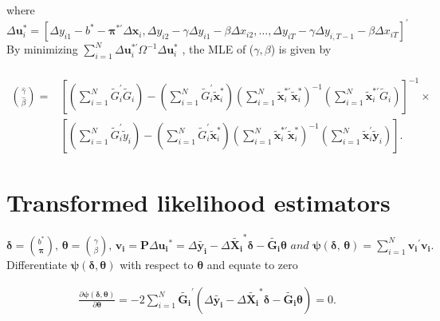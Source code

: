 \documentclass[12pt,a4paper,hyperref]{article}
\begin{document}
where
\begin{equation}
\Delta \boldsymbol{u}_{i}^{\ast}=[\Delta y_{i1}-b^{\ast}-\boldsymbol{\pi}^{\ast '} \Delta \boldsymbol{x}_{i}, \Delta y_{i2}-\gamma \Delta y_{i1}- \beta \Delta x_{i2},\ldots, \Delta y_{iT}-\gamma \Delta y_{i,T-1}-\beta \Delta x_{iT}]^{'}
\end{equation}
By minimizing $ \sum_{i=1}^{N}{\Delta \boldsymbol{u}_{i}^{\ast'}\Omega^{-1}\Delta \boldsymbol{u}_{i}^{\ast}}$
, the MLE of ($\gamma,\beta$) is given by \\ \\
\begin{equation}
\begin{split}
\binom{\hat{\gamma}}{\hat{\beta}}=&
[(\sum_{i=1}^{N}{\tilde{G}_{i}^{'}\tilde{G}_{i}})
-(\sum_{i=1}^{N}{\tilde{G}_{i}^{'} \boldsymbol{\tilde{x}}_{i}^{\ast}})(\sum_{i=1}^{N}{\boldsymbol{\tilde{x}}_{i}^{\ast'} \boldsymbol{\tilde{x}}_{i}^{\ast}})^{-1}(\sum_{i=1}^{N}{\boldsymbol{\tilde{x}}_{i}^{\ast'} \tilde{G}_{i}})]^{-1}
\times \\
&[(\sum_{i=1}^{N}{\tilde{G}_{i}^{'} \tilde{y}_{i}})-(\sum_{i=1}^{N}{\tilde{G}_{i}^{'} \boldsymbol{\tilde{x}}_{i}^{\ast}})(\sum_{i=1}^{N}{\boldsymbol{\tilde{x}}_{i}^{\ast'} \boldsymbol{\tilde{x}}_{i}^{\ast}})^{-1}(\sum_{i=1}^{N}{\boldsymbol{\tilde{x}}_{i}^{'} \boldsymbol{\tilde{y}}_{i}})].
\end{split}
\end{equation}





\section{Transformed likelihood estimators}

$\boldsymbol {\delta} =\binom{b^{\ast}}{\boldsymbol {\pi}} ,\, \boldsymbol {\theta} =\binom{\gamma}{\beta}, \,
\boldsymbol {v_{i}}=\boldsymbol {P}\Delta \boldsymbol {u_{i}}^{\ast}= \Delta \tilde{\boldsymbol {y_{i}}} - \Delta \boldsymbol { \tilde{X_{i}}}^{\ast} \boldsymbol {\delta} -\tilde{\boldsymbol {G_{i}}} \boldsymbol {\theta} \,\,and\,\,
\boldsymbol {\psi} (\boldsymbol {\delta} ,\, \boldsymbol {\theta}) =\sum_{i=1}^{N} \boldsymbol {v_{i}}^{'} \boldsymbol {v_{i}}. $\\
Differentiate $\boldsymbol {\psi} (\boldsymbol {\delta} , \boldsymbol {\theta})$ with respect to $\boldsymbol{\theta}$ and equate to zero

\begin{align}
\frac{\partial \boldsymbol {\psi} (\boldsymbol {\delta} , \boldsymbol {\theta})}{\partial  \boldsymbol{\theta}} =-2\sum_{i=1}^{N} \boldsymbol{\tilde{G_{i}}}^{'}(\Delta \boldsymbol {\tilde{\boldsymbol{y_{i}}}} - \Delta \tilde{\boldsymbol{X_{i}}}^{\ast} \boldsymbol {\delta} -\tilde{ \boldsymbol{G_{i}}} \boldsymbol {\theta})=0.
\end{align}
\end{document}
